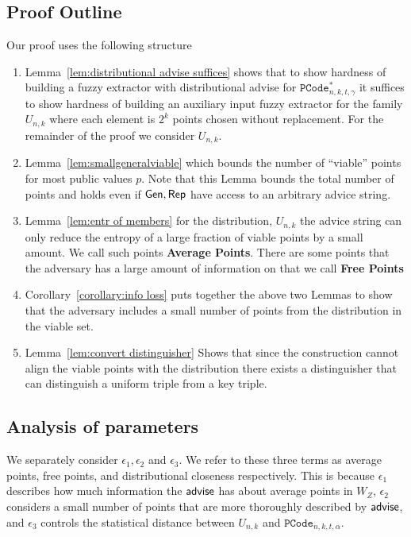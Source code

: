 \subsection{Proof Outline}
Our proof uses the following structure
\begin{enumerate}

\item Lemma~\ref{lem:distributional advise suffices} shows that to show hardness of building a fuzzy extractor with distributional advise for $\mathtt{PCode}_{n, k, t, \gamma}^{*}$ it suffices to show hardness of building an auxiliary input fuzzy extractor for the family $U_{n,k}$ where each element is $2^k$ points chosen without replacement. For the remainder of the proof we consider $U_{n,k}$.

\item Lemma~\ref{lem:smallgeneralviable} which bounds the number of ``viable'' points for most public values $p$.  Note that this Lemma bounds the total number of points and holds even if ${\mathsf{Gen}}, {\mathsf{Rep}}$ have access to an arbitrary advice string. 

\item Lemma~\ref{lem:entr of members} for the distribution, $U_{n,k}$ the advice string can only reduce the entropy of a large fraction of viable points by a small amount. We call such points \textbf{Average Points}.  There are some points that the adversary has a large amount of information on that we call \textbf{Free Points}

\item Corollary~\ref{corollary:info loss} puts together the above two Lemmas to show that the adversary includes a small number of points from the distribution in the viable set.

\item Lemma~\ref{lem:convert distinguisher} Shows that since the construction cannot align the viable points with the distribution there exists a distinguisher that can distinguish a uniform triple from a key triple. 
\end{enumerate}

\subsection{Analysis of parameters}
\label{ssec:analysis params}
We separately consider $\epsilon_1, \epsilon_2$ and $\epsilon_3$. We refer to these three terms as average points, free points, and distributional closeness respectively. This is because $\epsilon_1$ describes how much information the ${\mathsf{advise}}$ has about average points in $W_Z$, $\epsilon_2$ considers a small number of points that are more thoroughly described by ${\mathsf{advise}}$, and $\epsilon_3$ controls the statistical distance between $U_{n, k}$ and $\mathtt{PCode}_{n, k, t, \alpha}$.



